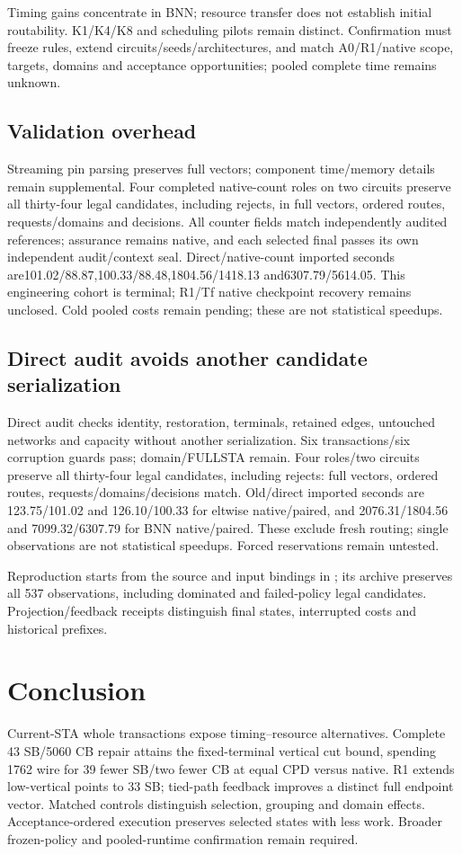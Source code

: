 \documentclass[conference,10pt]{IEEEtran}
\begin{document}
Timing gains concentrate in BNN; resource transfer does not establish initial routability. K1/K4/K8 and scheduling pilots remain distinct. Confirmation must freeze rules, extend circuits/seeds/architectures, and match A0/R1/native scope, targets, domains and acceptance opportunities; pooled complete time remains unknown.

\subsection{Validation overhead}
Streaming pin parsing preserves full vectors; component time/memory details remain supplemental. Four completed native-count roles on two circuits preserve all thirty-four legal candidates, including rejects, in full vectors, ordered routes, requests/domains and decisions. All counter fields match independently audited references; assurance remains native, and each selected final passes its own independent audit/context seal. Direct/native-count imported seconds are101.02/88.87,100.33/88.48,1804.56/1418.13 and6307.79/5614.05. This engineering cohort is terminal; R1/Tf native checkpoint recovery remains unclosed. Cold pooled costs remain pending; these are not statistical speedups.

\subsection{Direct audit avoids another candidate serialization}
Direct audit checks identity, restoration, terminals, retained edges, untouched networks and capacity without another serialization. Six transactions/six corruption guards pass; domain/FULLSTA remain. Four roles/two circuits preserve all thirty-four legal candidates, including rejects: full vectors, ordered routes, requests/domains/decisions match. Old/direct imported seconds are 123.75/101.02 and 126.10/100.33 for eltwise native/paired, and 2076.31/1804.56 and 7099.32/6307.79 for BNN native/paired. These exclude fresh routing; single observations are not statistical speedups. Forced reservations remain untested.

Reproduction starts from the source and input bindings in ; its archive preserves all 537 observations, including dominated and failed-policy legal candidates. Projection/feedback receipts distinguish final states, interrupted costs and historical prefixes.

\section{Conclusion}
Current-STA whole transactions expose timing--resource alternatives. Complete 43 SB/5060 CB repair attains the fixed-terminal vertical cut bound, spending 1762 wire for 39 fewer SB/two fewer CB at equal CPD versus native. R1 extends low-vertical points to 33 SB; tied-path feedback improves a distinct full endpoint vector. Matched controls distinguish selection, grouping and domain effects. Acceptance-ordered execution preserves selected states with less work. Broader frozen-policy and pooled-runtime confirmation remain required.
\end{document}
